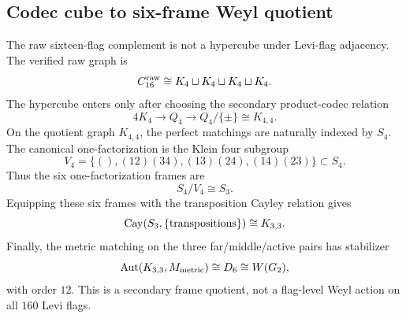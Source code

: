 
\subsection{Codec cube to six-frame Weyl quotient}
\label{subsec:bt676-k44-k33-frame-chain}

The raw sixteen-flag complement is not a hypercube under Levi-flag adjacency.  The verified raw graph is
\[
C_{16}^{\rm raw}\cong K_4\sqcup K_4\sqcup K_4\sqcup K_4.
\]
The hypercube enters only after choosing the secondary product-codec relation
\[
4K_4\longrightarrow Q_4\longrightarrow Q_4/\{\pm\}\cong K_{4,4}.
\]
On the quotient graph \(K_{4,4}\), the perfect matchings are naturally indexed by \(S_4\).  The canonical one-factorization is the Klein four subgroup
\[
V_4=\{(),(12)(34),(13)(24),(14)(23)\}\subset S_4.
\]
Thus the six one-factorization frames are
\[
S_4/V_4\cong S_3.
\]
Equipping these six frames with the transposition Cayley relation gives
\[
\operatorname{Cay}(S_3,\{\hbox{transpositions}\})\cong K_{3,3}.
\]
Finally, the metric matching on the three far/middle/active pairs has stabilizer
\[
\operatorname{Aut}(K_{3,3},M_{\rm metric})\cong D_6\cong W(G_2),
\]
with order \(12\).  This is a secondary frame quotient, not a flag-level Weyl action on all \(160\) Levi flags.
